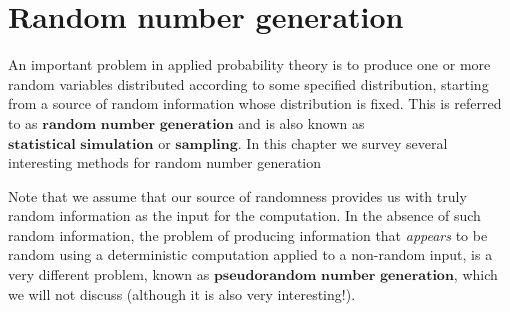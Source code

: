\chapter{Random number generation}

An important problem in applied probability theory is
to produce one or more random variables distributed
according to some specified distribution, starting
from a source of random information whose distribution
is fixed. This is referred to as
$\textbf{random number generation}$ and is also known
as $\textbf{statistical simulation}$ or
$\textbf{sampling}$. In this chapter we survey
several interesting methods for random number
generation

Note that we assume that our source of randomness
provides us with truly random information as the input
for the computation. In the absence of such random
information, the problem of producing information that
\emph{appears} to be random using a deterministic
computation applied to a non-random input, is a very
different problem, known as
$\textbf{pseudorandom number generation}$, which we
will not discuss (although it is also very
interesting!).













